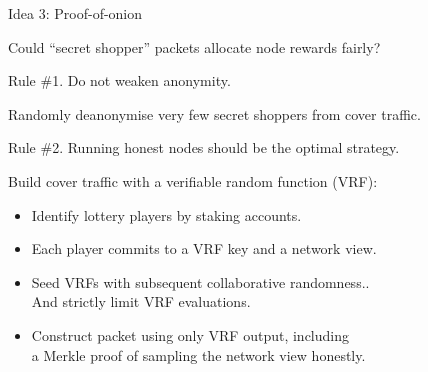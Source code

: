 \documentclass[fleqn,xcolor={usenames,dvipsnames},notes,aspectratio=169]{beamer} %
\begin{document}


\begin{frame}{Idea 3: Proof-of-onion}

Could ``secret shopper'' packets allocate node rewards fairly?

\bigskip\medskip

Rule \#1.  Do not weaken anonymity. \\ \medskip

Randomly deanonymise very few secret shoppers from cover traffic.

\bigskip

Rule \#2.  Running honest nodes should be the optimal strategy. \\ \medskip

Build cover traffic with a verifiable random function (VRF):
\begin{itemize}
\item Identify lottery players by staking accounts.
\item Each player commits to a VRF key and a network view.
\item Seed VRFs with subsequent collaborative randomness.. \\
 \hspace*{3pt}  And strictly limit VRF evaluations.
\item Construct packet using only VRF output, including \\
 \hspace*{3pt} a Merkle proof of sampling the network view honestly. 
\end{itemize}

\end{frame}


\end{document}
